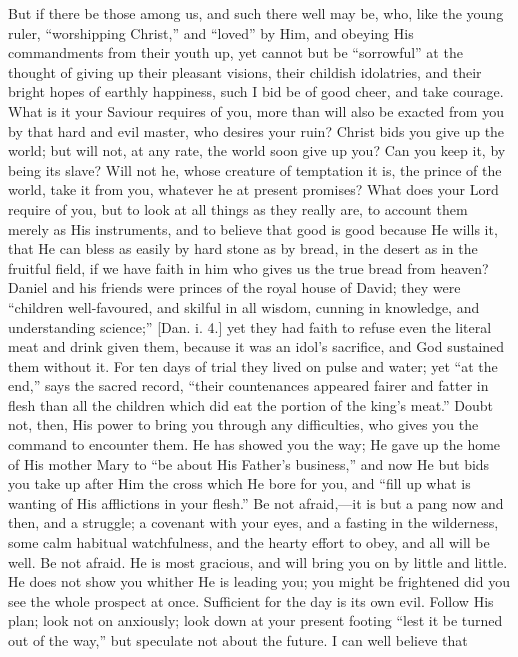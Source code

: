 But if there be those among us, and such there well
may be, who, like the young ruler, ``worshipping
Christ,'' and ``loved'' by Him, and obeying
His commandments from their youth up, yet cannot but be
``sorrowful'' at the thought of giving up their
pleasant visions, their childish idolatries, and their
bright hopes of earthly happiness, such I bid be of good
cheer, and take courage. What is it your Saviour requires
of you, more than will also be exacted from you by that
hard and evil master, who desires your ruin? Christ bids
you give up the world; but will not, at any rate, the
world soon give up you? Can you keep it, by being its
slave? Will not he, whose creature of temptation it is,
the prince of the world, take it from you, whatever he at
present promises? What does your Lord require of you, but
to look at all things as they really are, to account them
merely as His instruments, and to believe that good is
good because He wills it, that He can bless as easily by
hard stone as by bread, in the desert as in the fruitful
field, if we have faith in him who gives us the true bread from heaven? Daniel and his friends were princes of
the royal house of David; they were ``children
well-favoured, and skilful in all wisdom, cunning in
knowledge, and understanding science;'' [Dan. i. 4.]
yet they had faith to refuse even the literal meat and
drink given them, because it was an idol's sacrifice, and
God sustained them without it. For ten days of trial they
lived on pulse and water; yet ``at the end,''
says the sacred record, ``their countenances appeared
fairer and fatter in flesh than all the children which
did eat the portion of the king's meat.'' Doubt not,
then, His power to bring you through any difficulties,
who gives you the command to encounter them. He has
showed you the way; He gave up the home of His mother
Mary to ``be about His Father's business,'' and
now He but bids you take up after Him the cross which He
bore for you, and ``fill up what is wanting of His
afflictions in your flesh.'' Be not afraid,—it
is but a pang now and then, and a struggle; a covenant
with your eyes, and a fasting in the wilderness, some
calm habitual watchfulness, and the hearty effort to
obey, and all will be well. Be not afraid. He is most
gracious, and will bring you on by little and little. He
does not show you whither He is leading you; you might be
frightened did you see the whole prospect at once.
Sufficient for the day is its own evil. Follow His plan;
look not on anxiously; look down at your present footing
``lest it be turned out of the way,'' but
speculate not about the future. I can well believe that
